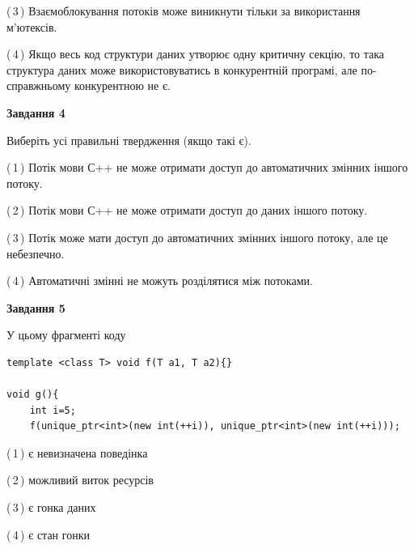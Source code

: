 \documentclass[12pt, ukrainian]{article}
\begin{document}
\begin {large}
{(\,3\,) Взаємоблокування потоків може виникнути тільки за використання м’ютексів.%

(\,4\,) Якщо весь код структури даних утворює одну критичну секцію, то така структура даних може використовуватись в конкурентній програмі, але по-справжньо\-му конкурентною не є.%



\begin{center}
\textbf{Завдання 4}
\end{center}
Виберіть усі правильні твердження (якщо такі є).\par
\vspace{2mm}

(\,1\,) Потік мови С++ не може отримати доступ до автоматичних змінних іншого потоку.%

(\,2\,) Потік мови С++ не може отримати доступ до даних іншого потоку.%

(\,3\,) Потік може мати доступ до автоматичних змінних іншого потоку, але це небезпечно.%

(\,4\,) Автоматичні змінні не можуть розділятися між потоками.%



\begin{center}
\textbf{Завдання 5}
\end{center}
У цьому фрагменті коду
\begin{verbatim}
template <class T> void f(T a1, T a2){}

void g(){
    int i=5;
    f(unique_ptr<int>(new int(++i)), unique_ptr<int>(new int(++i)));
\end{verbatim}

(\,1\,) є невизначена поведінка%

(\,2\,) можливий виток ресурсів%

(\,3\,) є гонка даних%

(\,4\,) є стан гонки%


}
\end {large}
\end{document}

